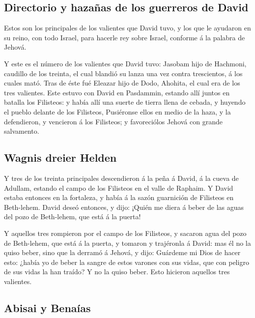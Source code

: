 \hypertarget{directorio-y-hazauxf1as-de-los-guerreros-de-david}{%
\subsection{Directorio y hazañas de los guerreros de
David}\label{directorio-y-hazauxf1as-de-los-guerreros-de-david}}

 Estos son los principales de los valientes que David tuvo,
y los que le ayudaron en su reino, con todo Israel, para hacerle rey
sobre Israel, conforme á la palabra de Jehová.

 Y este es el número de los valientes que David tuvo:
Jasobam hijo de Hachmoni, caudillo de los treinta, el cual blandió su
lanza una vez contra trescientos, á los cuales mató.  Tras
de éste fué Eleazar hijo de Dodo, Ahohita, el cual era de los tres
valientes.  Este estuvo con David en Pasdammin, estando
allí juntos en batalla los Filisteos: y había allí una suerte de tierra
llena de cebada, y huyendo el pueblo delante de los Filisteos,
 Pusiéronse ellos en medio de la haza, y la defendieron, y
vencieron á los Filisteos; y favoreciólos Jehová con grande salvamento.

\hypertarget{wagnis-dreier-helden}{%
\subsection{Wagnis dreier Helden}\label{wagnis-dreier-helden}}

 Y tres de los treinta principales descendieron á la peña á
David, á la cueva de Adullam, estando el campo de los Filisteos en el
valle de Raphaim.  Y David estaba entonces en la fortaleza,
y había á la sazón guarnición de Filisteos en Beth-lehem. 
David deseó entonces, y dijo: ¡Quién me diera á beber de las aguas del
pozo de Beth-lehem, que está á la puerta!

 Y aquellos tres rompieron por el campo de los Filisteos, y
sacaron agua del pozo de Beth-lehem, que está á la puerta, y tomaron y
trajéronla á David: mas él no la quiso beber, sino que la derramó á
Jehová, y dijo:  Guárdeme mi Dios de hacer esto: ¿había yo
de beber la sangre de estos varones con sus vidas, que con peligro de
sus vidas la han traído? Y no la quiso beber. Esto hicieron aquellos
tres valientes.

\hypertarget{abisai-y-benauxedas}{%
\subsection{Abisai y Benaías}\label{abisai-y-benauxedas}}

